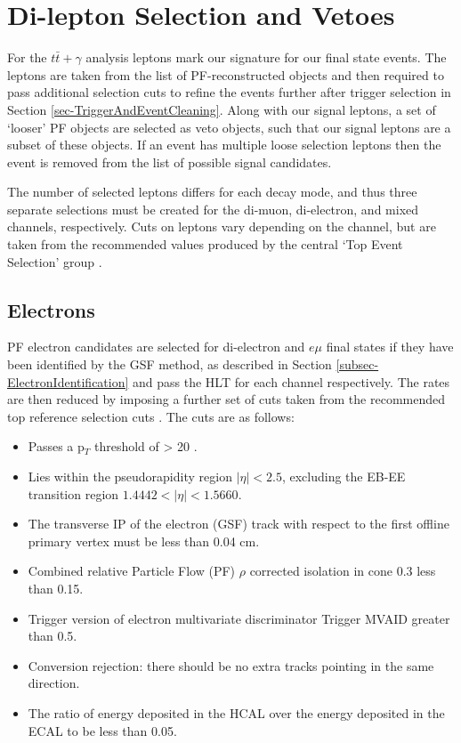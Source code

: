 
\section{Di-lepton Selection and Vetoes}

For the $t\bar{t}+\gamma$ analysis leptons mark our signature for our final state events. The leptons are taken from the list of PF-reconstructed objects and then required to pass additional selection cuts to refine the events further after trigger selection in Section \ref{sec-TriggerAndEventCleaning}. Along with our signal leptons, a set of `looser' PF objects are selected as veto objects, such that our signal leptons are a subset of these objects. If an event has multiple loose selection leptons then the event is removed from the list of possible signal candidates.

The number of selected leptons differs for each decay mode, and thus three separate selections must be created for the di-muon, di-electron, and mixed channels, respectively. Cuts on leptons vary depending on the channel, but are taken from the recommended values produced by the central `Top Event Selection' group \cite{TopEventSelection}. 

\subsection{Electrons}

PF electron candidates are selected for di-electron and $e\mu$ final states if they have been identified by the GSF method, as described in Section \ref{subsec-ElectronIdentification} and pass the HLT for each channel respectively. The rates are then reduced by imposing a further set of cuts taken from the recommended top reference selection cuts \cite{TOPEGM1}. The cuts are as follows:

\begin{itemize}
	\item Passes a p$_T$ threshold of > 20 \GeV.
	\item Lies within the pseudorapidity region $|\eta| < 2.5$, excluding the EB-EE transition region $1.4442 < |\eta| < 1.5660$.
	\item The transverse IP of the electron (GSF) track with respect to the first offline primary vertex must be less than 0.04 cm. 
	\item Combined relative Particle Flow (PF) $\rho$ corrected isolation in cone 0.3 less than 0.15.
	\item Trigger version of electron multivariate discriminator Trigger MVAID greater than 0.5.
	\item Conversion rejection: there should be no extra tracks pointing in the same direction.
	\item The ratio of energy deposited in the HCAL over the energy deposited in the ECAL to be less than 0.05.
\end{itemize} 

